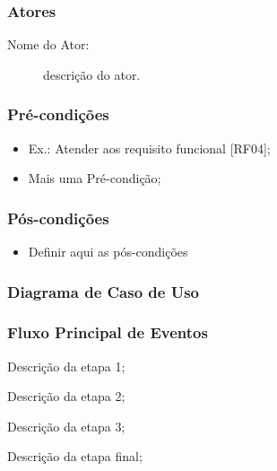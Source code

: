 \documentclass{article}
\begin{document}
  \subsubsection*{Atores}
  \begin{description}
   \item[Nome do Ator:] descrição do ator.
  \end{description}
  
  \subsubsection*{Pré-condições}  
  \begin{itemize}
   \item Ex.: Atender aos requisito funcional [RF04];
   \item Mais uma Pré-condição;
  \end{itemize}

  \subsubsection*{Pós-condições}
  \begin{itemize}
   \item Definir aqui as pós-condições
  \end{itemize}
  
  \subsubsection*{Diagrama de Caso de Uso}
  
  
  \subsubsection{\color{black}Fluxo Principal de Eventos}
  
  \begin{mainflow}
   \item Descrição da etapa 1;
   \item Descrição da etapa 2;
   \item Descrição da etapa 3;
   \item Descrição da etapa final;
  \end{mainflow}
  
\end{document}
